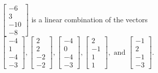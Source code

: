 \begin{exercise}
\begin{exerciseStatement}
  \end{exerciseStatement}
  \begin{exerciseAnswer}
   \(\left[\begin{array}{c}
-6 \\
3 \\
-10 \\
-8
\end{array}\right]\) 
  	 is  
	a linear combination of the vectors \(\left[\begin{array}{c}
-4 \\
1 \\
-4 \\
-3
\end{array}\right] , \left[\begin{array}{c}
2 \\
2 \\
-2 \\
-2
\end{array}\right] , \left[\begin{array}{c}
-4 \\
0 \\
-4 \\
-3
\end{array}\right] , \left[\begin{array}{c}
2 \\
-1 \\
1 \\
1
\end{array}\right] , \text{ and } \left[\begin{array}{c}
-1 \\
2 \\
-1 \\
-3
\end{array}\right]\).

	
  


  \end{exerciseAnswer}
\end{exercise}